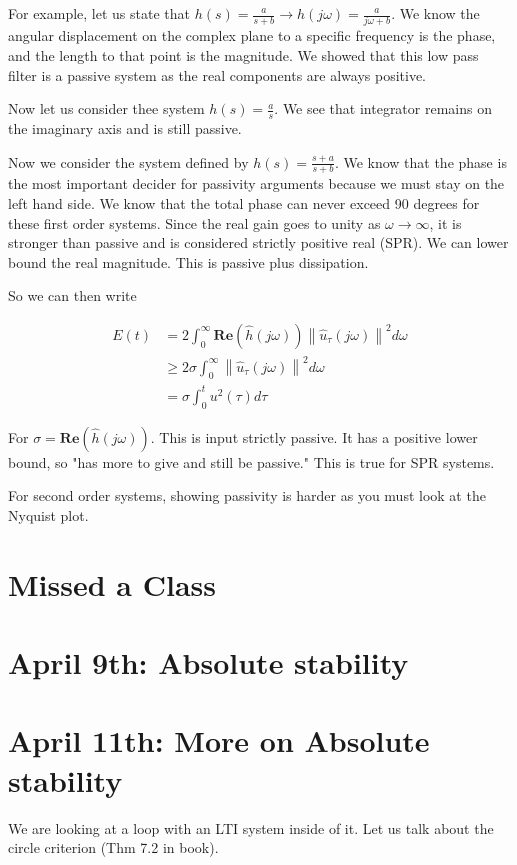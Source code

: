 \documentclass[11pt]{article}
\newcommand{\norm}[1]{\left\lVert#1\right\rVert}
\begin{document}
For example, let us state that $h(s) = \frac{a}{s+b} \rightarrow h(j\omega) = \frac{a}{j\omega+b}$. We know the angular displacement on the complex plane to a specific frequency is the phase, and the length to that point is the magnitude. We showed that this low pass filter is a passive system as the real components are always positive.

Now let us consider thee system $h(s) = \frac{a}{s}$. We see that integrator remains on the imaginary axis and is still passive.

Now we consider the system defined by $h(s) = \frac{s+a}{s+b}$. We know that the phase is the most important decider for passivity arguments because we must stay on the left hand side. We know that the total phase can never exceed 90 degrees for these first order systems. Since the real gain goes to unity as $\omega \rightarrow \infty$, it is stronger than passive and is considered strictly positive real (SPR). We can lower bound the real magnitude. This is passive plus dissipation.

So we can then write


\begin{align}
	E(t) & = 2 \int_{0}^\infty  \mathbf{Re} (\hat{h}(j\omega)) \norm{\hat{u}_\tau (j\omega)}^2 d\omega \\
	& \geq 2\sigma \int_{0}^\infty \norm{\hat{u}_\tau (j\omega)}^2 d\omega \\
	& = \sigma \int_0^t u^2(\tau)d\tau
\end{align}

For $\sigma = \mathbf{Re} (\hat{h}(j\omega))$. This is input strictly passive. It has a positive lower bound, so "has more to give and still be passive." This is true for SPR systems.

For second order systems, showing passivity is harder as you must look at the Nyquist plot.


\section*{Missed a Class}

\section*{April 9th: Absolute stability}

\section*{April 11th: More on Absolute stability}
We are looking at a loop with an LTI system inside of it. Let us talk about the circle criterion (Thm 7.2 in book).
\end{document}

